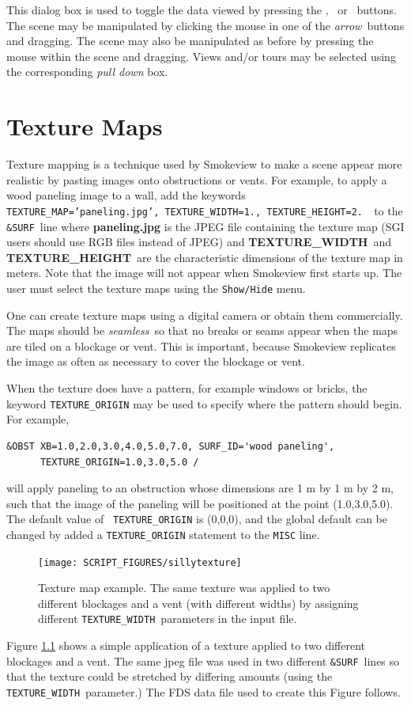 \documentclass[11pt,twoside]{book}
\newcommand{\frameit}[1]{\fbox{\tt #1}}
\begin{document}
This dialog box is used to toggle the data viewed by pressing the
\frameit{Smoke/Fire}, \frameit{Temperature}\ or \frameit{Oxygen}\
buttons. The scene may be manipulated by clicking the mouse in one
of the {\em arrow}\ buttons and dragging.  The scene may also be
manipulated as before by pressing the mouse within the scene and
dragging. Views and/or tours may be selected using the
corresponding {\em pull down} box.

\chapter{Texture Maps} \label{chapter:texturemaps} Texture mapping is a technique used by
Smokeview to make a scene appear more realistic by pasting images
onto obstructions or vents. For example, to apply a wood paneling
image to a wall, add the keywords {\tt
TEXTURE\_MAP='paneling.jpg', TEXTURE\_WIDTH=1., TEXTURE\_HEIGHT=2.
}\ to the {\tt \&SURF}\ line where {\bf paneling.jpg} is the JPEG
file containing the texture map (SGI users should use RGB files
instead of JPEG) and {\bf TEXTURE\_WIDTH}\ and {\bf
TEXTURE\_HEIGHT}\ are the characteristic dimensions of the texture
map in meters. Note that the image will not appear when Smokeview
first starts up. The user must select the texture maps using the
{\tt Show/Hide} menu.

One can create texture maps using a digital camera or obtain them
commercially.  The maps should be {\em seamless}\ so that no
breaks or seams appear when the maps are tiled on a blockage or
vent.  This is important, because Smokeview replicates the image
as often as necessary to cover the blockage or vent.

When the texture does have a pattern, for example windows or
bricks, the keyword {\tt TEXTURE\_ORIGIN} may be used to specify
where the pattern should begin.  For example,
\begin{lstlisting}
&OBST XB=1.0,2.0,3.0,4.0,5.0,7.0, SURF_ID='wood paneling',
      TEXTURE_ORIGIN=1.0,3.0,5.0 /
\end{lstlisting}
\noindent will apply paneling to an obstruction whose dimensions
are 1 m by 1 m by 2 m, such that the image of the paneling will be
positioned at the point (1.0,3.0,5.0). The default value of {\tt
TEXTURE\_ORIGIN} is (0,0,0), and the global default can be changed
by added a {\tt TEXTURE\_ORIGIN} statement to the {\tt MISC} line.

\begin{figure}[\figoptions]
\centerline{\texttt{[image: SCRIPT\_FIGURES/sillytexture]}
} \caption [Texture map example.] {
Texture map example.  The same texture was applied to two different
blockages and a vent (with different widths) by assigning different {\tt TEXTURE\_WIDTH}\
parameters in the input file.
} \label{figTextures}
\end{figure}
Figure \ref{figTextures} shows a simple application of a texture
applied to two different blockages and a vent.  The same jpeg file
was used in two different {\tt \&SURF}\ lines so that the texture
could be stretched by differing amounts (using the {\tt
TEXTURE\_WIDTH}\ parameter.)  The FDS data file used to create
this Figure follows.
\end{document}
